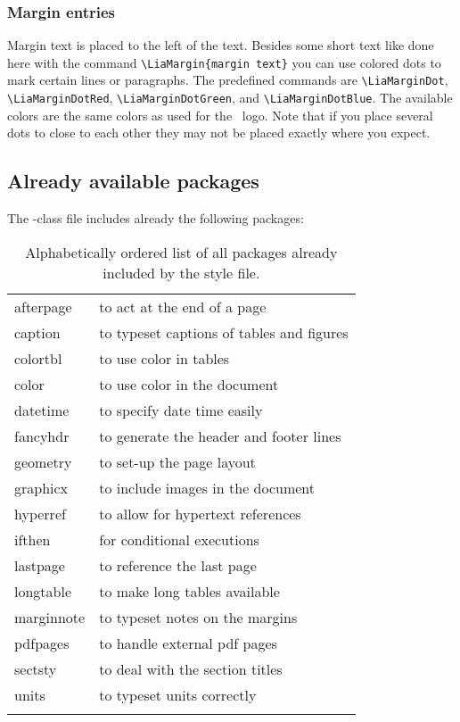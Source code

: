 \documentclass{lia}
\newcommand{\CC}[1]{{\ttfamily #1}}
\begin{document}
\subsubsection{Margin entries}

\LiaMarginDotBlue Margin text is placed to the left of the text.
Besides some short text like done here with the command 
\verb+\LiaMargin{margin text}+
you can use colored dots to mark certain lines or paragraphs.
The predefined commands are
\verb+\LiaMarginDot+,
\verb+\LiaMarginDotRed+,
\verb+\LiaMarginDotGreen+, and
\verb+\LiaMarginDotBlue+.
\LiaMarginDotGreen The available colors are the same colors as used for
the \Lia\ logo.
Note \LiaMarginDotRed that if you place several dots to close to each other
they may not be placed exactly where you expect.

\subsection{Already available packages}

The \Lia-class file includes already the following packages:

\begin{longtable}{|l|l|}\hline
\CC{afterpage} & to act at the end of a page \\
\CC{caption} & to typeset captions of tables and figures \\
\CC{colortbl} & to use color in tables \\
\CC{color} & to use color in the document \\
\CC{datetime} & to specify date time easily \\
\CC{fancyhdr} & to generate the header and footer lines \\
\CC{geometry} & to set-up the page layout \\
\CC{graphicx} & to include images in the document \\
\CC{hyperref} & to allow for hypertext references \\
\CC{ifthen} & for conditional executions \\
\CC{lastpage} & to reference the last page \\
\CC{longtable} & to make long tables available \\
\CC{marginnote} & to typeset notes on the margins \\
\CC{pdfpages} & to handle external pdf pages \\
\CC{sectsty} & to deal with the section titles \\
\CC{units} & to typeset units correctly \\
\hline
\caption{\label{tab:packages}Alphabetically ordered list of all packages
already included by the style file.}
\end{longtable}
\end{document}
